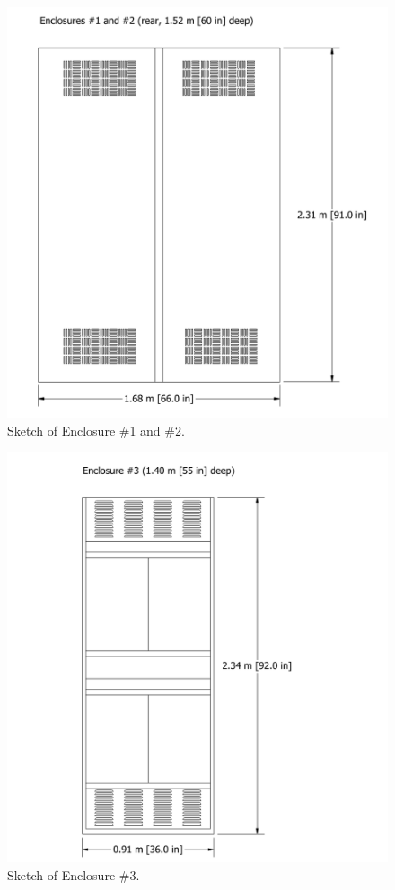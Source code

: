 \documentclass[12pt]{article}
\begin{document}
\begin{figure}[!ht]
\begin{center}
\includegraphics[width=\textwidth]{../FIGURES/Cabinet_1}
\end{center}
\caption{Sketch of Enclosure \#1 and \#2.}
\label{Cabinet_1}
\end{figure}

\begin{figure}[p]
\begin{center}
\includegraphics[width=\textwidth]{../FIGURES/Cabinet_3}
\end{center}
\caption{Sketch of Enclosure \#3.}
\label{Cabinet_3}
\end{figure}
\end{document}

